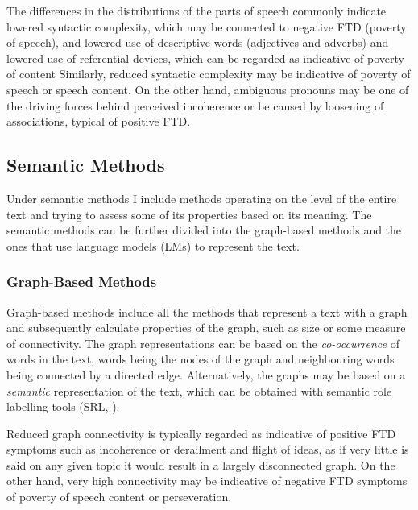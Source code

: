 The differences in the distributions of the parts of speech commonly indicate lowered syntactic complexity, which may be connected to negative FTD (poverty of speech), and lowered use of descriptive words (adjectives and adverbs) and lowered use of referential devices, which can be regarded as indicative of poverty of content %
Similarly, reduced syntactic complexity may be indicative of poverty of speech or speech content. On the other hand, ambiguous pronouns may be one of the driving forces behind perceived incoherence or be caused by loosening of associations, typical of positive FTD.

\subsection{Semantic Methods}
Under semantic methods I include methods operating on the level of the entire text and trying to assess some of its properties based on its meaning. The semantic methods can be further divided into the graph-based methods and the ones that use language models (LMs) to represent the text.


\subsubsection{Graph-Based Methods}
Graph-based methods include all the methods that represent a text with a graph and subsequently calculate properties of the graph, such as size or some measure of connectivity. The graph representations can be based on the \textit{co-occurrence} of words in the text, words being the nodes of the graph and neighbouring words being connected by a directed edge. Alternatively, the graphs may be based on a \textit{semantic} representation of the text, which can be obtained with semantic role labelling tools (SRL, \cite{gildea2002automatic}). 


Reduced graph connectivity is typically regarded as indicative of positive FTD symptoms such as incoherence or derailment and flight of ideas, as if very little is said on any given topic it would result in a largely disconnected graph. On the other hand, very high connectivity may be indicative of negative FTD symptoms of poverty of speech content or perseveration.

